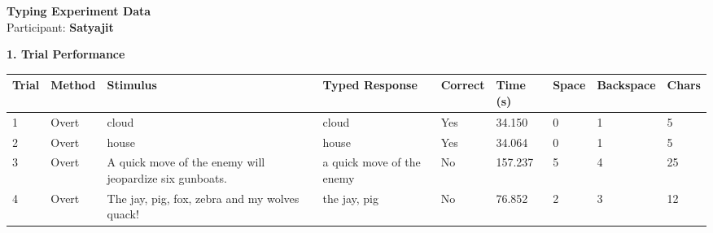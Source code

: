 \documentclass[10pt,a4paper]{article}
\begin{document}

\begin{center}
    {\Large\bfseries Typing Experiment Data}\\
    \vspace{2pt}
    Participant: \textbf{Satyajit}
\end{center}

\vspace{0.25cm}


\noindent
{\large\bfseries 1. Trial Performance}

\vspace{0.08cm}

\begin{center}
\begin{tabularx}{\textwidth}{
    C{0.45in}
    C{0.65in}
    L{2.35in}
    L{2.55in}
    C{0.65in}
    C{0.65in}
    C{0.55in}
    C{0.75in}
    C{0.55in}
}
\toprule

\textbf{Trial} &
\textbf{Method} &
\textbf{Stimulus} &
\textbf{Typed Response} &
\textbf{Correct} &
\textbf{Time (s)} &
\textbf{Space} &
\textbf{Backspace} &
\textbf{Chars}
\\

\midrule

1 &
Overt &
cloud &
cloud &
Yes &
34.150 &
0 &
1 &
5
\\

2 &
Overt &
house &
house &
Yes &
34.064 &
0 &
1 &
5
\\

3 &
Overt &
A quick move of the enemy will jeopardize six gunboats. &
a quick move of the enemy &
No &
157.237 &
5 &
4 &
25
\\

4 &
Overt &
The jay, pig, fox, zebra and my wolves quack! &
the jay, pig &
No &
76.852 &
2 &
3 &
12
\\

\bottomrule
\end{tabularx}
\end{center}

\vspace{0.35cm}

\end{document}
